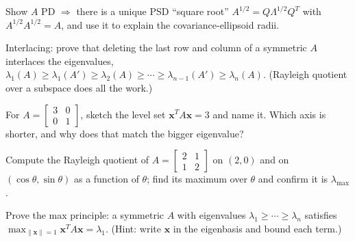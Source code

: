 \begin{exercise}[hard]
Show $A$ PD $\Rightarrow$ there is a unique PSD ``square root''
$A^{1/2}=Q\Lambda^{1/2}Q^{T}$ with $A^{1/2}A^{1/2}=A$, and use it to
explain the covariance-ellipsoid radii.
\end{exercise}

\begin{exercise}[hard]
Interlacing: prove that deleting the last row and column of a symmetric
$A$ interlaces the eigenvalues,
$\lambda_1(A)\ge\lambda_1(A')\ge\lambda_2(A)\ge\cdots\ge\lambda_{n-1}(A')
\ge\lambda_n(A)$. (Rayleigh quotient over a subspace does all the work.)
\end{exercise}
\begin{exercise}[easy]
For $A=\begin{bmatrix}3&0\\0&1\end{bmatrix}$, sketch the level set
$\mathbf{x}^{T}A\mathbf{x}=3$ and name it. Which axis is shorter, and
why does that match the bigger eigenvalue?
\end{exercise}
\begin{exercise}[medium]
Compute the Rayleigh quotient of
$A=\begin{bmatrix}2&1\\1&2\end{bmatrix}$ on $(2,0)$ and on
$(\cos\theta,\sin\theta)$ as a function of $\theta$; find its maximum
over $\theta$ and confirm it is $\lambda_{\max}$.
\end{exercise}
\begin{exercise}[hard]
Prove the max principle: a symmetric $A$ with eigenvalues
$\lambda_1\geq\cdots\geq\lambda_n$ satisfies
$\max_{\|\mathbf{x}\|=1}\mathbf{x}^{T}A\mathbf{x}=\lambda_1$.
(Hint: write $\mathbf{x}$ in the eigenbasis and bound each term.)
\end{exercise}

